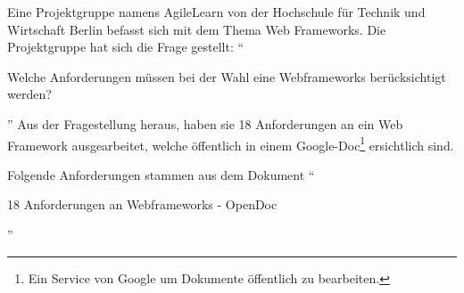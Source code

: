 \documentclass[
11pt, %
a4paper, %
BCOR25mm, %
DIV14, %
footsepline = false, %
headsepline, %
twoside, %
openright,
abstracton, %
listof=totocnumbered, %
bibliography=totocnumbered %
]{scrreprt}
\begin{document}
  Eine Projektgruppe namens AgileLearn von der Hochschule für Technik und
  Wirtschaft Berlin befasst sich mit dem Thema Web Frameworks. Die
  Projektgruppe hat sich die Frage gestellt: ``\begin{itshape}Welche
  Anforderungen müssen bei der Wahl eine Webframeworks berücksichtigt
  werden?\end{itshape}'' Aus der Fragestellung heraus, haben sie 18
  Anforderungen an ein Web Framework ausgearbeitet, welche öffentlich in einem
  Google-Doc\footnote{Ein Service von Google um Dokumente öffentlich zu
  bearbeiten.} ersichtlich sind.
  
  Folgende Anforderungen stammen aus dem Dokument ``\begin{itshape}18
  Anforderungen an Webframeworks -
  OpenDoc\end{itshape}''\cite{AnforderungenAnWebframeworks}
\end{document}
